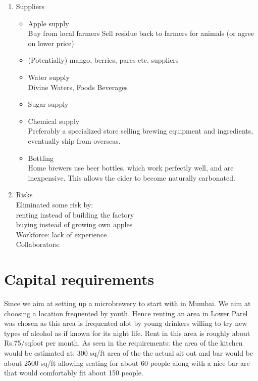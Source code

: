 \documentclass{article}
\begin{document}
\begin{enumerate}
	\item Suppliers
		\begin{itemize}
		\item Apple supply \\
			Buy from local farmers %
        	Sell residue back to farmers for animals (or agree on lower price)
		\item (Potentially) mango, berries, pares etc. suppliers
		\item Water supply \\
			Divine Waters, Foods Beverages
		\item Sugar supply \\
		\item Chemical supply\\
			Preferably a specialized store selling brewing equipment and ingredients, eventually ship from overseas.
		\item Bottling \\
			Home brewers use beer bottles, which work perfectly well, and are inexpensive. This allows the cider to become naturally carbonated.
		\end{itemize}

\item Risks \\
Eliminated some risk by:\\
	renting instead of building the factory\\
	buying instead of growing own apples\\
Workforce: lack of experience\\
Collaborators: \\
	\end{enumerate}



\section{Capital requirements}

Since we aim at setting up a microbrewery to start with in Mumbai. We aim at choosing a location frequented by youth.
Hence renting an area in Lower Parel was chosen as this area is frequented alot by young drinkers willing to try new types of alcohol as if known for its night life.
Rent in this area is roughly about Rs.75/sqfoot per month.
As seen in the requirements:
the area of the kitchen would be estimated at: 300 sq/ft
area of the the actual sit out and bar would be about 2500 sq/ft allowing seating for about 60 people along with a nice bar are that would comfortably fit about 150 people.
\end{document}
